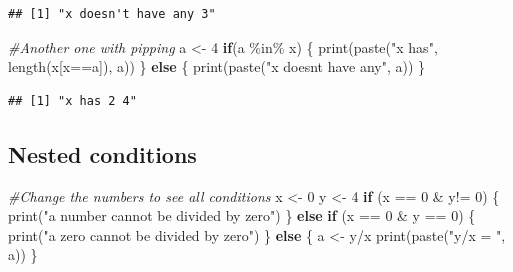 \documentclass[
]{book}
\newenvironment{Shaded}{\begin{snugshade}}{\end{snugshade}}
\newcommand{\CommentTok}[1]{\textcolor[rgb]{0.56,0.35,0.01}{\textit{#1}}}
\newcommand{\ControlFlowTok}[1]{\textcolor[rgb]{0.13,0.29,0.53}{\textbf{#1}}}
\newcommand{\DecValTok}[1]{\textcolor[rgb]{0.00,0.00,0.81}{#1}}
\newcommand{\FunctionTok}[1]{\textcolor[rgb]{0.00,0.00,0.00}{#1}}
\newcommand{\NormalTok}[1]{#1}
\newcommand{\OtherTok}[1]{\textcolor[rgb]{0.56,0.35,0.01}{#1}}
\newcommand{\SpecialCharTok}[1]{\textcolor[rgb]{0.00,0.00,0.00}{#1}}
\newcommand{\StringTok}[1]{\textcolor[rgb]{0.31,0.60,0.02}{#1}}
\begin{document}
\begin{verbatim}
## [1] "x doesn't have any 3"
\end{verbatim}

\begin{Shaded}
\begin{Highlighting}[]
\CommentTok{\#Another one with pipping}
\NormalTok{a }\OtherTok{\textless{}{-}} \DecValTok{4}
\ControlFlowTok{if}\NormalTok{(a }\SpecialCharTok{\%in\%}\NormalTok{ x) \{}
  \FunctionTok{print}\NormalTok{(}\FunctionTok{paste}\NormalTok{(}\StringTok{"x has"}\NormalTok{, }\FunctionTok{length}\NormalTok{(x[x}\SpecialCharTok{==}\NormalTok{a]), a))}
\NormalTok{\} }\ControlFlowTok{else}\NormalTok{ \{}
  \FunctionTok{print}\NormalTok{(}\FunctionTok{paste}\NormalTok{(}\StringTok{"x doesn\textquotesingle{}t have any"}\NormalTok{, a))}
\NormalTok{\}}
\end{Highlighting}
\end{Shaded}

\begin{verbatim}
## [1] "x has 2 4"
\end{verbatim}

\hypertarget{nested-conditions}{%
\subsection{Nested conditions}\label{nested-conditions}}

\begin{Shaded}
\begin{Highlighting}[]
\CommentTok{\#Change the numbers to see all conditions}
\NormalTok{x }\OtherTok{\textless{}{-}} \DecValTok{0}
\NormalTok{y }\OtherTok{\textless{}{-}} \DecValTok{4}
\ControlFlowTok{if}\NormalTok{ (x }\SpecialCharTok{==} \DecValTok{0} \SpecialCharTok{\&}\NormalTok{ y}\SpecialCharTok{!=} \DecValTok{0}\NormalTok{) \{}
  \FunctionTok{print}\NormalTok{(}\StringTok{"a number cannot be divided by zero"}\NormalTok{)}
\NormalTok{\} }\ControlFlowTok{else} \ControlFlowTok{if}\NormalTok{ (x }\SpecialCharTok{==} \DecValTok{0} \SpecialCharTok{\&}\NormalTok{ y }\SpecialCharTok{==} \DecValTok{0}\NormalTok{) \{}
  \FunctionTok{print}\NormalTok{(}\StringTok{"a zero cannot be divided by zero"}\NormalTok{)}
\NormalTok{\} }\ControlFlowTok{else}\NormalTok{ \{}
\NormalTok{  a }\OtherTok{\textless{}{-}}\NormalTok{ y}\SpecialCharTok{/}\NormalTok{x }
  \FunctionTok{print}\NormalTok{(}\FunctionTok{paste}\NormalTok{(}\StringTok{"y/x = "}\NormalTok{, a))}
\NormalTok{\}}
\end{Highlighting}
\end{Shaded}
\end{document}
